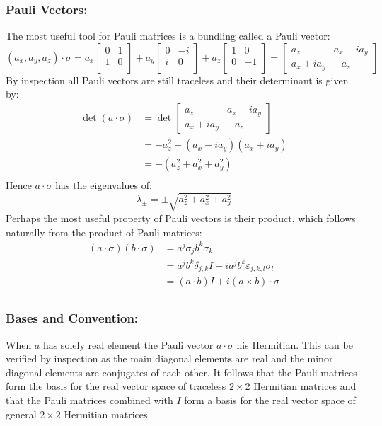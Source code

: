 \subsubsection{Pauli Vectors:}
The most useful tool for Pauli matrices is a bundling called a Pauli vector:
\[
	(a_x,a_y,a_z)\cdot\sigma = 
	a_x\begin{bmatrix}0&1\\1&0\\\end{bmatrix}+
	a_y\begin{bmatrix}0&-i\\i&0\\\end{bmatrix}+
	a_z\begin{bmatrix}1&0\\0&-1\\\end{bmatrix}
	=\begin{bmatrix}a_z&a_x-ia_y\\a_x+ia_y&-a_z\end{bmatrix}
\]
By inspection all Pauli vectors are still traceless and their determinant is given by:
\[\begin{aligned}
	\det(a\cdot\sigma) &= \det\begin{bmatrix}a_z&a_x-ia_y\\a_x+ia_y&-a_z\end{bmatrix}\\
	&= -a_z^2-(a_x-ia_y)(a_x+ia_y)\\
	&= -(a_z^2+a_x^2+a_y^2)\\
\end{aligned}\]
Hence $a\cdot\sigma$ has the eigenvalues of:
\[\lambda_\pm = \pm\sqrt{a_z^2+a_x^2+a_y^2}\]
Perhaps the most useful property of Pauli vectors is their product,
which follows naturally from the product of Pauli matrices:
\[\begin{aligned}
(a\cdot \sigma)(b\cdot \sigma) &= a^j\sigma_jb^k\sigma_k\\
&= a^jb^k\delta_{j,k}I+ia^jb^k\varepsilon_{j,k,l}\sigma_l\\
&= (a\cdot b)I+i(a\times b)\cdot \sigma\\
\end{aligned}\]

\subsubsection{Bases and Convention:}
When $a$ has solely real element the Pauli vector $a\cdot\sigma$ his Hermitian.
This can be verified by inspection as the main diagonal elements are real and the minor diagonal elements are conjugates of each other.
It follows that the Pauli matrices form the basis for the real vector space of traceless $2\times2$ Hermitian matrices and that the Pauli matrices combined with $I$ form a basis for the real vector space of general $2\times2$ Hermitian matrices.
\\

